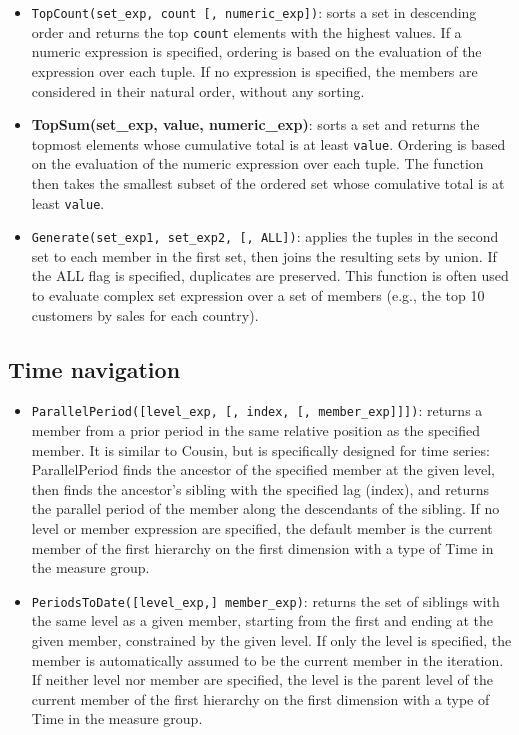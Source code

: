 \begin{itemize}
    \item \texttt{TopCount(set\_exp, count [, numeric\_exp])}: sorts a set in descending order and returns the top \texttt{count} elements with the highest values. If a numeric expression is specified, ordering is based on the evaluation of the expression over each tuple. If no expression is specified, the members are considered in their natural order, without any sorting.
    \item \textbf{TopSum(set\_exp, value, numeric\_exp)}: sorts a set and returns the topmost elements whose cumulative total is at least \texttt{value}. Ordering is based on the evaluation of the numeric expression over each tuple. The function then takes the smallest subset of the ordered set whose comulative total is at least \texttt{value}.
    \item \texttt{Generate(set\_exp1, set\_exp2, [, ALL])}: applies the tuples in the second set to each member in the first set, then joins the resulting sets by union. If the ALL flag is specified, duplicates are preserved. This function is often used to evaluate complex set expression over a set of members (e.g., the top 10 customers by sales for each country).
\end{itemize}

\subsection{Time navigation}

\begin{itemize}
    \item \texttt{ParallelPeriod([level\_exp, [, index, [, member\_exp]]])}: returns a member from a prior period in the same relative position as the specified member. It is similar to Cousin, but is specifically designed for time series: ParallelPeriod finds the ancestor of the specified member at the given level, then finds the ancestor's sibling with the specified lag (index), and returns the parallel period of the member along the descendants of the sibling. If no level or member expression are specified, the default member is the current member of the first hierarchy on the first dimension with a type of Time in the measure group.
    \item \texttt{PeriodsToDate([level\_exp,] member\_exp)}: returns the set of siblings with the same level as a given member, starting from the first and ending at the given member, constrained by the given level. If only the level is specified, the member is automatically assumed to be the current member in the iteration. If neither level nor member are specified, the level is the parent level of the current member of the first hierarchy on the first dimension with a type of Time in the measure group.
\end{itemize}

